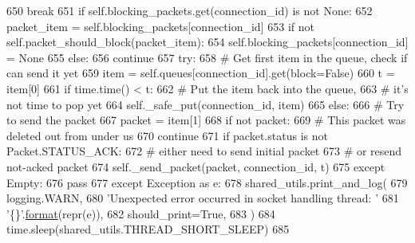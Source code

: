 \begin{DoxyCode}
650                         \textcolor{keywordflow}{break}
651                     \textcolor{keywordflow}{if} self.blocking\_packets.get(connection\_id) \textcolor{keywordflow}{is} \textcolor{keywordflow}{not} \textcolor{keywordtype}{None}:
652                         packet\_item = self.blocking\_packets[connection\_id]
653                         \textcolor{keywordflow}{if} \textcolor{keywordflow}{not} self.packet\_should\_block(packet\_item):
654                             self.blocking\_packets[connection\_id] = \textcolor{keywordtype}{None}
655                         \textcolor{keywordflow}{else}:
656                             \textcolor{keywordflow}{continue}
657                     \textcolor{keywordflow}{try}:
658                         \textcolor{comment}{# Get first item in the queue, check if can send it yet}
659                         item = self.queues[connection\_id].get(block=\textcolor{keyword}{False})
660                         t = item[0]
661                         \textcolor{keywordflow}{if} time.time() < t:
662                             \textcolor{comment}{# Put the item back into the queue,}
663                             \textcolor{comment}{# it's not time to pop yet}
664                             self.\_safe\_put(connection\_id, item)
665                         \textcolor{keywordflow}{else}:
666                             \textcolor{comment}{# Try to send the packet}
667                             packet = item[1]
668                             \textcolor{keywordflow}{if} \textcolor{keywordflow}{not} packet:
669                                 \textcolor{comment}{# This packet was deleted out from under us}
670                                 \textcolor{keywordflow}{continue}
671                             \textcolor{keywordflow}{if} packet.status \textcolor{keywordflow}{is} \textcolor{keywordflow}{not} Packet.STATUS\_ACK:
672                                 \textcolor{comment}{# either need to send initial packet}
673                                 \textcolor{comment}{# or resend not-acked packet}
674                                 self.\_send\_packet(packet, connection\_id, t)
675                     \textcolor{keywordflow}{except} Empty:
676                         \textcolor{keywordflow}{pass}
677                 \textcolor{keywordflow}{except} Exception \textcolor{keyword}{as} e:
678                     shared\_utils.print\_and\_log(
679                         logging.WARN,
680                         \textcolor{stringliteral}{'Unexpected error occurred in socket handling thread: '}
681                         \textcolor{stringliteral}{'\{\}'}.\hyperlink{namespaceparlai_1_1chat__service_1_1services_1_1messenger_1_1shared__utils_a32e2e2022b824fbaf80c747160b52a76}{format}(repr(e)),
682                         should\_print=\textcolor{keyword}{True},
683                     )
684             time.sleep(shared\_utils.THREAD\_SHORT\_SLEEP)
685 
\end{DoxyCode}
